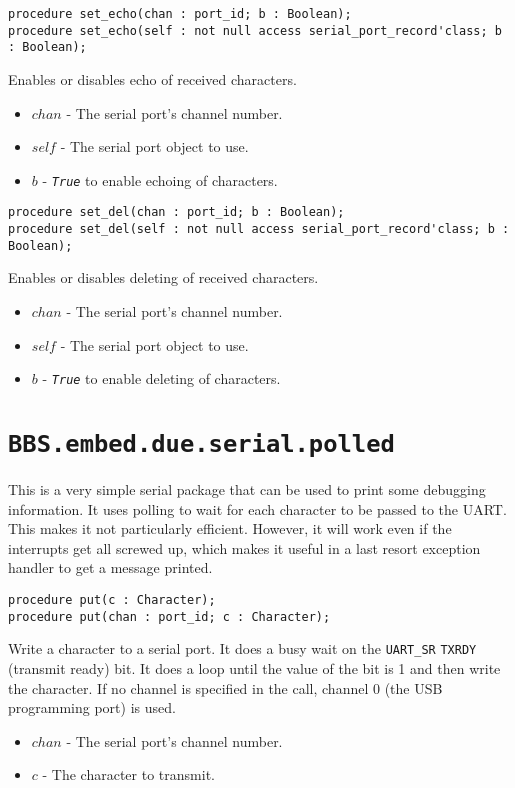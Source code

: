 \documentclass[10pt, openany]{book}
\newcommand{\indexfunc}[1]{\index[func]{#1}}
\newcommand{\package}[1]{\texttt{#1}}
\newcommand{\constant}[1]{\emph{\texttt{#1}}}
\begin{document}
\begin{lstlisting}
procedure set_echo(chan : port_id; b : Boolean);
procedure set_echo(self : not null access serial_port_record'class; b : Boolean);
\end{lstlisting}
\indexfunc{set\_echo}
Enables or disables echo of received characters.
\begin{itemize}
  \item $chan$ - The serial port's channel number.
  \item $self$ - The serial port object to use.
  \item $b$ - \constant{True} to enable echoing of characters.
\end{itemize}

\begin{lstlisting}
procedure set_del(chan : port_id; b : Boolean);
procedure set_del(self : not null access serial_port_record'class; b : Boolean);
\end{lstlisting}
\indexfunc{set\_del}
Enables or disables deleting of received characters.
\begin{itemize}
  \item $chan$ - The serial port's channel number.
  \item $self$ - The serial port object to use.
  \item $b$ - \constant{True} to enable deleting of characters.
\end{itemize}

\section{\package{BBS.embed.due.serial.polled}}
This is a very simple serial package that can be used to print some debugging information.  It uses polling to wait for each character to be passed to the UART.  This makes it not particularly efficient. However, it will work even if the interrupts get all screwed up, which makes it useful in a last resort exception handler to get a message printed.

\begin{lstlisting}
procedure put(c : Character);
procedure put(chan : port_id; c : Character);
\end{lstlisting}
\indexfunc{put}
Write a character to a serial port.  It does a busy wait on the \package{UART\_SR} \package{TXRDY} (transmit ready) bit.  It does a loop until the value of the bit is 1 and then write the character.  If no channel is specified in the call, channel 0 (the USB programming port) is used.
\begin{itemize}
  \item $chan$ - The serial port's channel number.
  \item $c$ - The character to transmit.
\end{itemize}
\end{document}
